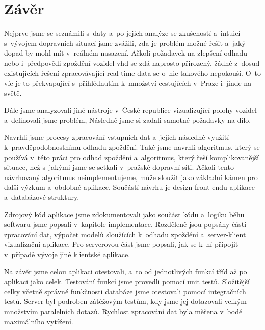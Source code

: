 \chapter*{Závěr}


Nejprve jsme se seznámili s~daty a~po jejich analýze se zkušeností a~intuicí s~vývojem dopravních situací jsme zvážili, zda je problém možné řešit a~jaký dopad by mohl mít v~reálném nasazení. Ačkoli požadavek na zlepšení odhadu nebo i~předpovědi zpoždění vozidel \gls{vhd} se zdá naprosto přirozený, žádné z~dosud existujících řešení zpracovávající real-time data se o~nic takového nepokouší. O~to víc je to překvapující s~přihlédnutím k~množství cestujících v~Praze i~jinde na světě.


\bigbreak

Dále jsme analyzovali jiné nástroje v~České republice vizualizující polohy vozidel a~definovali jsme problém, Následně jsme si zadali samotné požadavky na dílo.

\bigbreak

Navrhli jsme procesy zpracování vstupních dat a~jejich následné využití k~pravděpodobnostnímu odhadu zpoždění. Také jsme navrhli algoritmus, který se používá v~této práci pro odhad zpoždění a~algoritmus, který řeší komplikovanější situace, než s~jakými jsme se setkali v~pražské dopravní síti. Ačkoli tento návrhovaný algoritmus neimplementujeme, může sloužit jako základní kámen pro další výzkum a~obdobné aplikace. Součástí návrhu je design front-endu aplikace a~databázové struktury.


\bigbreak

Zdrojový kód aplikace jsme zdokumentovali jako součást kódu a~logiku běhu softwaru jsme popsali v~kapitole implementace. Rozděleně jsou popsány části zpracování dat, výpočet modelů sloužících k~odhadu zpoždění a~server-klient vizualizační aplikace. Pro serverovou část jsme popsali, jak se k~ní připojit v~případě vývoje jiné klientské aplikace.


\bigbreak

Na závěr jsme celou aplikaci otestovali, a~to od jednotlivých funkcí tříd až po aplikaci jako celek. Testování funkcí jsme provedli pomocí unit testů. Složitější celky včetně správné funkčnosti databáze jsme otestovali pomocí integračních testů. Server byl podroben zátěžovým testům, kdy jsme jej dotazovali velkým množstvím paralelních dotazů. Rychlost zpracování dat byla měřena v~bodě maximálního vytížení.


\bigbreak

